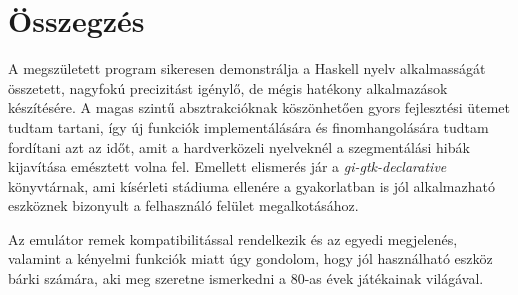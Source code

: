 \chapter{Összegzés} %
\label{ch:sum}

A megszületett program sikeresen demonstrálja a Haskell nyelv alkalmasságát összetett, nagyfokú precizitást igénylő, de mégis hatékony alkalmazások készítésére. A magas szintű absztrakcióknak köszönhetően gyors fejlesztési ütemet tudtam tartani, így új funkciók implementálására és finomhangolására tudtam fordítani azt az időt, amit a hardverközeli nyelveknél a szegmentálási hibák kijavítása emésztett volna fel. Emellett elismerés jár a \emph{gi-gtk-declarative} könyvtárnak, ami kísérleti stádiuma ellenére a gyakorlatban is jól alkalmazható eszköznek bizonyult a felhasználó felület megalkotásához.

Az emulátor remek kompatibilitással rendelkezik és az egyedi megjelenés, valamint a kényelmi funkciók miatt úgy gondolom, hogy jól használható eszköz bárki számára, aki meg szeretne ismerkedni a 80-as évek játékainak világával.
